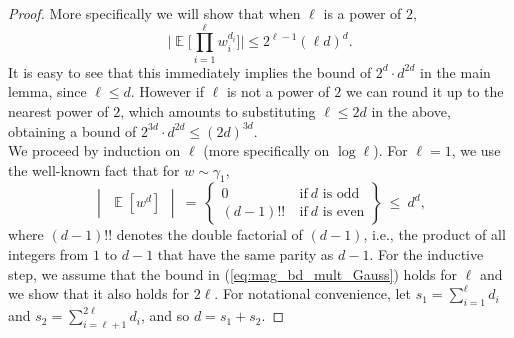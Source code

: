 \documentclass[11pt]{article}
\newcommand{\inbrace}[1]{\left \{ #1 \right \}}
\newcommand{\inmat}[1]{\begin{matrix} #1 \end{matrix}}
\newcommand{\inabs}[1]{\begin{vmatrix} #1 \end{vmatrix}}
\DeclareMathOperator*{\Ex}{\mathbb{E}}
\newcommand{\sIF}{\ \mathrm{if} \ }
\begin{document}
\begin{proof}
	More specifically we will show that when $\ell$ is a power of $2$,
	\begin{equation}\label{eq:mag_bd_mult_Gauss}
	\bigg|  \Ex \bigg[ \prod_{i=1}^{\ell} w_i^{d_i} \bigg] \bigg| \le 2^{\ell-1} (\ell d)^{d}.
	\end{equation}
	It is easy to see that this immediately implies the bound of $2^d \cdot d^{2d}$ in the main lemma, since $\ell \le d$. However if $\ell$ is not a power of $2$ we can round it up to the nearest power of $2$, which amounts to substituting $\ell \le 2d$ in the above, obtaining a bound of $2^{3d} \cdot d^{2d} \le (2d)^{3d}$.\\%
	
	\noindent We proceed by induction on $\ell$ (more specifically on $\log \ell$). For $\ell = 1$, we use the well-known fact that for $w \sim \gamma_1$,
	$$\inabs{\Ex[w^d]} ~=~ \inbrace{\inmat{0 & \sIF d \text{ is odd} \\ (d-1)!! & \sIF d \text{ is even}}} ~\le~ d^{d},$$
	where $(d-1)!!$ denotes the double factorial of $(d-1)$, i.e., the product of all integers from $1$ to $d-1$ that have the same parity as $d-1$. For the inductive step, we assume that the bound in (\ref{eq:mag_bd_mult_Gauss}) holds for $\ell$ and we show that it also holds for $2\ell$. For notational convenience, let $s_1 = \sum_{i=1}^{\ell} d_i$ and $s_2 = \sum_{i=\ell+1}^{2\ell} d_i$, and so $d = s_1 + s_2$.
	

\end{proof}
\end{document}
